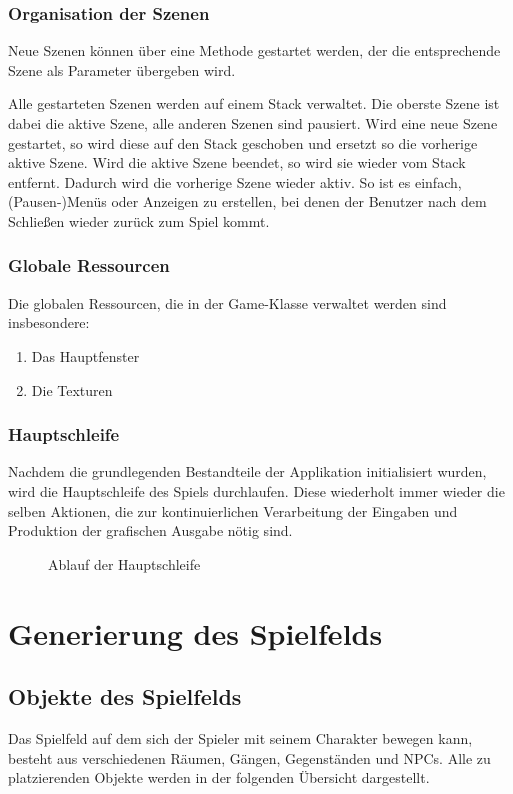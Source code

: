 		\subsubsection{Organisation der Szenen}
		
		Neue Szenen können über eine Methode gestartet werden, der die entsprechende Szene als Parameter übergeben wird.

		Alle gestarteten Szenen werden auf einem Stack verwaltet. Die oberste Szene ist dabei die aktive Szene, alle anderen Szenen sind pausiert. Wird eine neue Szene gestartet, so wird diese auf den Stack geschoben und ersetzt so die vorherige aktive Szene. Wird die aktive Szene beendet, so wird sie wieder vom Stack entfernt. Dadurch wird die vorherige Szene wieder aktiv. So ist es einfach, (Pausen-)Menüs oder Anzeigen zu erstellen, bei denen der Benutzer nach dem Schließen wieder zurück zum Spiel kommt.

		\subsubsection{Globale Ressourcen}
		Die globalen Ressourcen, die in der Game-Klasse verwaltet werden sind insbesondere:

		\begin{enumerate}
			\item Das Hauptfenster
			\item Die Texturen
		\end{enumerate}

		\subsubsection{Hauptschleife}
		Nachdem die grundlegenden Bestandteile der Applikation initialisiert wurden, wird die Hauptschleife des Spiels durchlaufen. Diese wiederholt immer wieder die selben Aktionen, die zur kontinuierlichen Verarbeitung der Eingaben und Produktion der grafischen Ausgabe nötig sind.

		\begin{figure}[H]
			\centering
			\scalebox{0.7}{}
			\caption{Ablauf der Hauptschleife}
		\end{figure}

\section{Generierung des Spielfelds}

\subsection{Objekte des Spielfelds}
Das Spielfeld auf dem sich der Spieler mit seinem Charakter bewegen kann, besteht aus
verschiedenen Räumen, Gängen, Gegenständen und NPCs. Alle zu platzierenden Objekte
werden in der folgenden Übersicht dargestellt.

